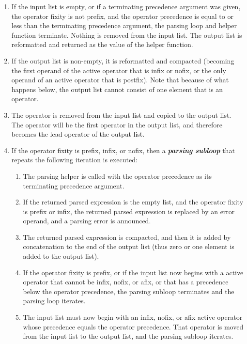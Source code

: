 \documentclass[12pt]{article}
\newcommand{\key}[1]{{\bf \em #1}\index{#1}}
\begin{document}
\begin{enumerate}
\begin{enumerate}
\end{enumerate}

\item If the input list is empty, or if
a terminating precedence argument was given, the operator fixity is
not prefix, and the operator precedence
is equal to or less than the terminating precedence argument,
the parsing loop and helper function terminate.
Nothing is removed from the input list.  The output list is reformatted
and returned as the value of the helper function.

\item If the output list is non-empty, it
is reformatted and compacted (becoming the
first operand of the active operator that is infix or nofix, or
the only operand of an active operator that is postfix).
Note that because of what happens below, the output list cannot
consist of one element that is an operator.

\item The operator is removed from the input list and copied
to the output list.  The operator will be the first
operator in the output list, and therefore
becomes the lead operator of the output list.

\item
If the operator fixity is prefix, infix, or nofix, then
a \key{parsing subloop} that repeats the following iteration is executed:

\begin{enumerate}

\item The parsing helper is called with
the operator precedence as its terminating precedence argument.

\item If the returned parsed expression is the empty list, and
the operator fixity is prefix or infix, the returned parsed expression is
replaced by an error operand, and a parsing error is announced.

\item The returned parsed expression is compacted, and then it
is added by concatenation to the end of the output list (thus
zero or one element is added to the output list).

\item If the operator fixity is prefix, or if
the input list now begins with a active operator that cannot be
infix, nofix, or afix, or that has a precedence below the
operator precedence,
the parsing subloop terminates and the parsing loop iterates.

\item The input list must now begin with an infix, nofix, or
afix active operator whose precedence equals the operator precedence.
That operator is moved from the input list to the output list,
and the parsing subloop iterates.

\end{enumerate}

\end{enumerate}
\end{document}

